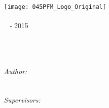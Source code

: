 
\begin{titlepage}

\begin{center}


\texttt{[image: 045PFM\_Logo\_Original]}\\[1cm]    

\textsc{\LARGE \myDepartment}\\[1.5cm]


\textsc{\Large \myTitle ~ - 2015}\\[0.5cm]


\HRule \\[0.4cm]
{ \huge \bfseries \myPhd}\\[0.4cm]

\HRule \\[1.5cm]


\begin{minipage}{0.8\textwidth}
\begin{center} \large

\emph{Author:}\\[0.4cm]

\myName \\
\texttt{\myemail}\\[1.5cm]

\emph{Supervisors:} \\[0.4cm]

\myProf \\[0.2cm]
\myOtherProf \\ [0.2cm]

\end{center}

\end{minipage}

\vfill

{\large \myTime}

\end{center}

\end{titlepage}
